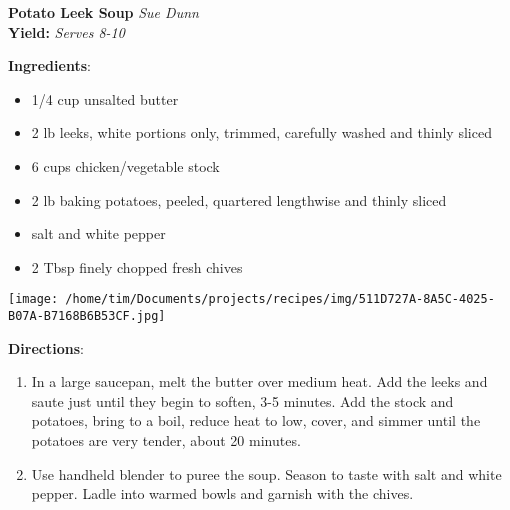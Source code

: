 \documentclass[11pt, twoside, openany]{book}
\begin{document}
\noindent\begin{minipage}[t]{\linewidth}%
{\Large\textbf{Potato Leek Soup}} \label{potato-leek-soup}\hfill\textit{Sue Dunn}\\
\textbf{Yield:} \textit{Serves 8-10}\\
\noindent\begin{minipage}[t]{0.78\linewidth}%
\textbf{Ingredients}:\vspace{-3mm}
\begin{multicols}{2}
\begin{itemize}\setlength\itemsep{-1mm}
\item 1/4 cup unsalted butter
\item 2 lb leeks, white portions only, trimmed, carefully washed and thinly sliced
\item 6 cups chicken/vegetable stock
\item 2 lb baking potatoes, peeled, quartered lengthwise and thinly sliced
\item salt and white pepper
\item 2 Tbsp finely chopped fresh chives
\end{itemize}
\end{multicols}
\end{minipage}
\noindent\begin{minipage}[t]{0.18\linewidth}
\centering \strut\vspace*{-\baselineskip}\newline
\texttt{[image: /home/tim/Documents/projects/recipes/img/511D727A-8A5C-4025-B07A-B7168B6B53CF.jpg]}\\
\end{minipage}\vspace{3mm}
\textbf{Directions}:
\vspace{-3mm}\begin{enumerate}\setlength\itemsep{-1mm}
\item In a large saucepan, melt the butter over medium heat. Add the leeks and saute just until they begin to soften, 3-5 minutes. Add the stock and potatoes, bring to a boil, reduce heat to low, cover, and simmer until the potatoes are very tender, about 20 minutes. 
\item Use handheld blender to puree the soup. Season to taste with salt and white pepper. Ladle into warmed bowls and garnish with the chives.
\end{enumerate}
\end{minipage}\vspace{8mm}
\end{document}
